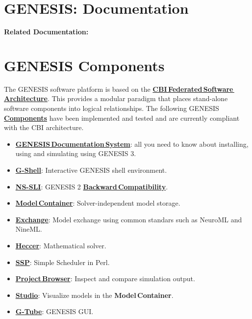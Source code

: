\documentclass[12pt]{article}
\begin{document}
\section*{GENESIS: Documentation}

{\bf Related Documentation:}

\section*{GENESIS Components}

The GENESIS software platform is based on the \href{../genesis-overview/genesis-overview.tex}{\bf CBI\,Federated\,Software\,Architecture}. This provides a modular paradigm that places stand-alone software components into logical relationships. The following GENESIS \href{../reserved-words/reserved-words.tex}{\bf Components} have been implemented and tested and are currently compliant with the CBI architecture.

\begin{itemize}
   \item[]\href{../documentation-overview/documentation-overview.tex}{\bf GENESIS\,Documentation\,System}: all you need to know about installing, using and simulating using GENESIS 3.
   \item[]\href{../gshell/gshell.tex}{\bf G-Shell}: Interactive GENESIS shell environment.
   \item[]\href{../ns-sli/ns-sli.tex}{\bf NS-SLI}: GENESIS 2 \href{../backward-compatibility/backward-compatibility.tex}{\bf Backward\,Compatibility}.
   \item[]\href{../model-container/model-container.tex}{\bf Model\,Container}: Solver-independent model storage.
   \item[]\href{../exchange/exchange.tex}{\bf Exchange}: Model exchange using common standars such as NeuroML and NineML.
   \item[]\href{../heccer/heccer.tex}{\bf Heccer}: Mathematical solver.
   \item[]\href{../ssp/ssp.tex}{\bf SSP}: Simple Scheduler in Perl.
   \item[]\href{../project-browser/project-browser.tex}{\bf Project\,Browser}: Inspect and compare simulation output.
   \item[]\href{../studio/studio.tex}{\bf Studio}: Visualize models in the {\bf Model\,Container}.
   \item[]\href{../gtube/gtube.tex}{\bf G-Tube}: GENESIS GUI.
\end{itemize}
\end{document}
